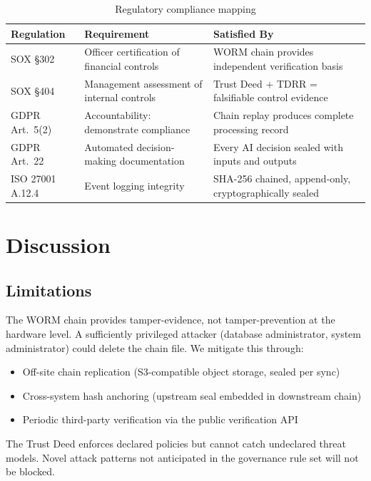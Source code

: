 \documentclass[12pt,letterpaper]{article}
\begin{document}
\begin{table}[h]
\centering
\caption{Regulatory compliance mapping}
\label{tab:compliance}
\begin{tabular}{@{}p{2.8cm}p{4.5cm}p{5cm}@{}}
\toprule
\textbf{Regulation} & \textbf{Requirement} & \textbf{Satisfied By} \\
\midrule
SOX \S302
  & Officer certification of financial controls
  & WORM chain provides independent verification basis \\[4pt]
SOX \S404
  & Management assessment of internal controls
  & Trust Deed + TDRR = falsifiable control evidence \\[4pt]
GDPR Art.\ 5(2)
  & Accountability: demonstrate compliance
  & Chain replay produces complete processing record \\[4pt]
GDPR Art.\ 22
  & Automated decision-making documentation
  & Every AI decision sealed with inputs and outputs \\[4pt]
ISO 27001 A.12.4
  & Event logging integrity
  & SHA-256 chained, append-only, cryptographically sealed \\
\bottomrule
\end{tabular}
\end{table}

\section{Discussion}
\label{sec:discussion}

\subsection{Limitations}

The WORM chain provides tamper-evidence, not tamper-prevention at the hardware
level. A sufficiently privileged attacker (database administrator, system
administrator) could delete the chain file. We mitigate this through:
\begin{itemize}
  \item Off-site chain replication (S3-compatible object storage, sealed per sync)
  \item Cross-system hash anchoring (upstream seal embedded in downstream chain)
  \item Periodic third-party verification via the public verification API
\end{itemize}

The Trust Deed enforces declared policies but cannot catch undeclared threat
models. Novel attack patterns not anticipated in the governance rule set will
not be blocked.
\end{document}
